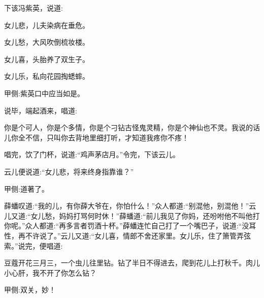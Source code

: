 \begin{parag}
    下该冯紫英，说道:
\end{parag}


\begin{poem}
    \begin{pl}女儿悲，儿夫染病在垂危。\end{pl}

    \begin{pl}女儿愁，大风吹倒梳妆楼。\end{pl}

    \begin{pl}女儿喜，头胎养了双生子。\end{pl}

    \begin{pl}女儿乐，私向花园掏蟋蟀。\end{pl}\begin{note}甲侧:紫英口中应当如是。\end{note}
\end{poem}


\begin{parag}
    说毕，端起酒来，唱道:
\end{parag}


\begin{qute2sp}
    \begin{poem}
        \begin{pl}你是个可人，你是个多情，你是个刁钻古怪鬼灵精，你是个神仙也不灵。我说的话儿你全不信，只叫你去背地里细打听，才知道我疼你不疼！\end{pl}
    \end{poem}
\end{qute2sp}


\begin{parag}
    唱完，饮了门杯，说道:“鸡声茅店月。”令完，下该云儿。
\end{parag}


\begin{parag}
    云儿便说道:“女儿悲，将来终身指靠谁？”\begin{note}甲侧:道著了。\end{note}薛蟠叹道:“我的儿，有你薛大爷在，你怕什么！”众人都道:“别混他，别混他！”云儿又道:“女儿愁，妈妈打骂何时休！”薛蟠道:“前儿我见了你妈，还吩咐他不叫他打你呢。”众人都道:“再多言者罚酒十杯。”薛蟠连忙自己打了一个嘴巴子，说道:“没耳性，再不许说了。”云儿又道:“女儿喜，情郎不舍还家里。女儿乐，住了箫管弄弦索。”说完，便唱道:
\end{parag}

\begin{qute2sp}
    \begin{poem}
        \begin{pl}豆蔻开花三月三，一个虫儿往里钻。钻了半日不得进去，爬到花儿上打秋千。肉儿小心肝，我不开了你怎么钻？\end{pl}
        \begin{note}甲侧:双关，妙！\end{note}
    \end{poem}
\end{qute2sp}


